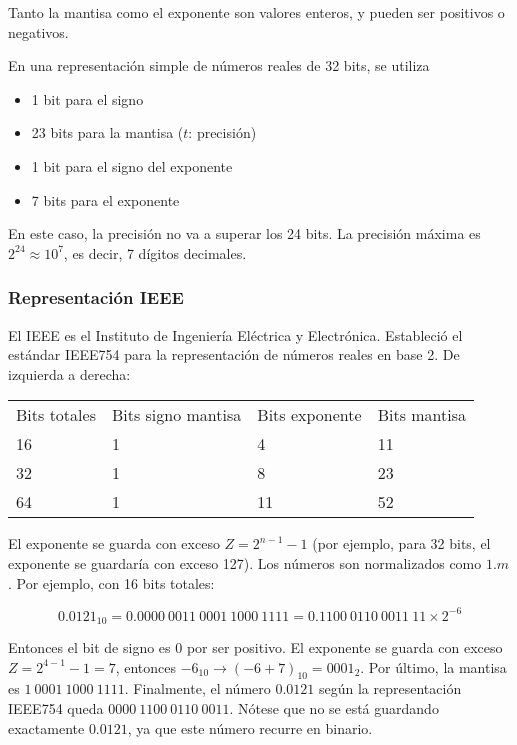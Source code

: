 \documentclass{article}
\begin{document}
Tanto la mantisa como el exponente son valores enteros, y pueden ser positivos o
negativos.

En una representación simple de números reales de 32 bits, se utiliza

\begin{itemize}
    \item 1 bit para el signo
    \item 23 bits para la mantisa ($t$: precisión)
    \item 1 bit para el signo del exponente
    \item 7 bits para el exponente
\end{itemize}

En este caso, la precisión no va a superar los 24 bits. La precisión máxima es
$2^{24}\approx10^7$, es decir, 7 dígitos decimales.

\subsubsection{Representación IEEE}

El IEEE es el Instituto de Ingeniería Eléctrica y Electrónica. Estableció el
estándar IEEE754 para la representación de números reales en base 2. De 
izquierda a derecha:

\begin{table}[h]
\centering
\begin{tabular}{llll}
Bits totales & Bits signo mantisa & Bits exponente & Bits mantisa \\
16           & 1                  & 4              & 11           \\
32           & 1                  & 8              & 23           \\
64           & 1                  & 11             & 52          
\end{tabular}
\end{table}

El exponente se guarda con exceso $Z=2^{n-1}-1$ (por ejemplo, para 32 bits, el 
exponente se guardaría con exceso 127). Los números son normalizados como $1.m$.
Por ejemplo, con 16 bits totales:

\begin{equation*}
0.0121_{10} = 0.0000\ 0011\ 0001\ 1000\ 1111 = 0.1100\ 0110\ 0011\ 11\times2^{-6}
\end{equation*}

Entonces el bit de signo es 0 por ser positivo. El exponente se guarda con 
exceso $Z=2^{4-1}-1=7$, entonces $-6_{10} \rightarrow (-6+7)_{10} = 0001_{2}$.
Por último, la mantisa es $1\ 0001\ 1000\ 1111$. Finalmente, el número $0.0121$
según la representación IEEE754 queda $0000\ 1100\ 0110\ 0011$. Nótese que no se
está guardando exactamente $0.0121$, ya que este número recurre en binario.
\end{document}
